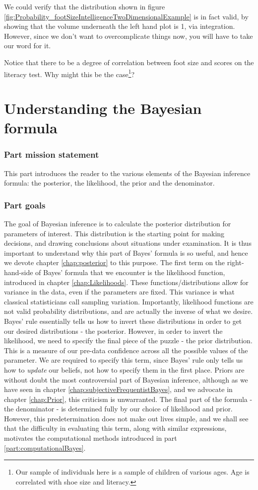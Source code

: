\documentclass[11pt,fullpage]{book}
\begin{document}
We could verify that the distribution shown in figure \ref{fig:Probability_footSizeIntelligenceTwoDimensionalExample} is in fact valid, by showing that the volume underneath the left hand plot is 1, via integration. However, since we don't want to overcomplicate things now, you will have to take our word for it.

Notice that there to be a degree of correlation between foot size and scores on the literacy test. Why might this be the case\footnote{Our sample of individuals here is a sample of children of various ages. Age is correlated with shoe size and literacy.}?


\part{Understanding the Bayesian formula}\label{part:bayesianFormula}
\section{Part mission statement}
This part introduces the reader to the various elements of the Bayesian inference formula: the posterior, the likelihood, the prior and the denominator.

\section{Part goals}
The goal of Bayesian inference is to calculate the posterior distribution for parameters of interest. This distribution is the starting point for making decisions, and drawing conclusions about situations under examination. It is thus important to understand why this part of Bayes' formula is so useful, and hence we devote chapter \ref{chap:posterior} to this purpose. The first term on the right-hand-side of Bayes' formula that we encounter is the likelihood function, introduced in chapter \ref{chap:Likelihoods}. These functions/distributions allow for variance in the data, even if the parameters are fixed. This variance is what classical statisticians call sampling variation. Importantly, likelihood functions are not valid probability distributions, and are actually the inverse of what we desire. Bayes' rule essentially tells us how to invert these distributions in order to get our desired distributions - the posterior. However, in order to invert the likelihood, we need to specify the final piece of the puzzle - the prior distribution. This is a measure of our pre-data confidence across all the possible values of the parameter. We are required to specify this term, since Bayes' rule only tells us how to \textit{update} our beliefs, not how to specify them in the first place. Priors are without doubt the most controversial part of Bayesian inference, although as we have seen in chapter \ref{chap:subjectiveFrequentistBayes}, and we advocate in chapter \ref{chap:Prior}, this criticism is unwarranted. The final part of the formula - the denominator - is determined fully by our choice of likelihood and prior. However, this predetermination does not make out lives simple, and we shall see that the difficulty in evaluating this term, along with similar expressions, motivates the computational methods introduced in part \ref{part:computationalBayes}.
\end{document}
